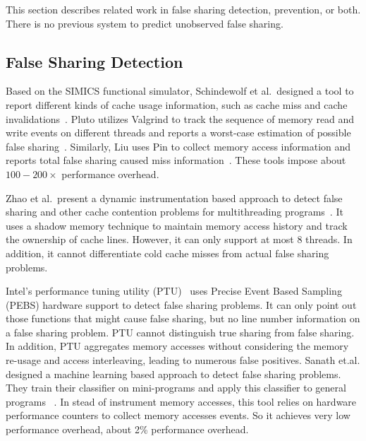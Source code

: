 \label{sec:relatedwork}

This section describes related work in false sharing detection, prevention, or both. There is no previous
system to predict unobserved false sharing.

\subsection{False Sharing Detection}
Based on the SIMICS functional simulator, Schindewolf et al.\ designed a tool to report different kinds of cache usage information, such as cache miss and cache invalidations~\cite{falseshare:simulator}. Pluto utilizes Valgrind to track the sequence of memory read and write events on different threads and reports a worst-case estimation of possible false sharing~\cite{falseshare:binaryinstrumentation1}.
Similarly, Liu uses Pin to collect memory access information and reports total false sharing caused miss information~\cite{falseshare:binaryinstrumentation2}.
These tools impose about $100-200\times$ performance overhead.

Zhao et al.\ present a dynamic instrumentation based approach to detect false sharing and other cache contention problems
for multithreading programs~\cite{qinzhaodetection}. 
It uses a shadow memory technique to maintain memory access history and track the ownership of cache lines. 
However, it can only support at most $8$ threads. In addition, it cannot differentiate cold cache misses from actual false sharing problems.

Intel's performance tuning utility (PTU)~\cite{detect:ptu, detect:intel} uses Precise Event Based Sampling (PEBS) hardware support to detect false sharing problems.  It can only point out those functions that might cause false sharing, but no line number information on a false sharing problem.  PTU cannot distinguish true sharing from false sharing. In addition, PTU aggregates memory accesses without considering the memory re-usage and access interleaving, leading to numerous false positives. Sanath et.al. designed a machine learning based approach to detect false sharing problems. They train their classifier on mini-programs and apply this classifier to general programs ~\cite{mldetect}. 
In stead of instrument memory accesses, this tool relies on hardware performance counters to collect memory accesses events. So it achieves very low performance overhead, about 2\% performance overhead. 


